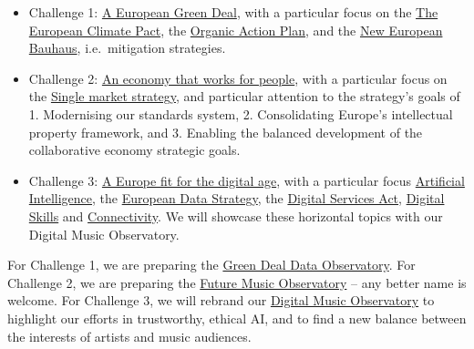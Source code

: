 \documentclass[
  a4paper,
  openany, a4paper, oneside]{book}
\providecommand{\tightlist}{%
  \setlength{\itemsep}{0pt}\setlength{\parskip}{0pt}}
\begin{document}
\begin{itemize}
\tightlist
\item
  Challenge 1: \href{https://ec.europa.eu/info/strategy/priorities-2019-2024/european-green-deal_en}{A European Green Deal}, with a particular focus on the \href{https://ec.europa.eu/commission/presscorner/detail/en/ip_20_2323}{The European Climate Pact}, the \href{https://ec.europa.eu/info/food-farming-fisheries/farming/organic-farming/organic-action-plan_en}{Organic Action Plan}, and the \href{https://ec.europa.eu/commission/presscorner/detail/en/IP_21_111}{New European Bauhaus}, i.e.~mitigation strategies.
\item
  Challenge 2: \href{https://ec.europa.eu/info/strategy/priorities-2019-2024/economy-works-people_en\#:~:text=Individuals\%20and\%20businesses\%20in\%20the,needs\%20of\%20the\%20EU's\%20citizens.}{An economy that works for people}, with a particular focus on the \href{https://ec.europa.eu/info/strategy/priorities-2019-2024/economy-works-people/internal-market_en}{Single market strategy}, and particular attention to the strategy's goals of 1. Modernising our standards system, 2. Consolidating Europe's intellectual property framework, and 3. Enabling the balanced development of the collaborative economy strategic goals.
\item
  Challenge 3: \href{https://ec.europa.eu/info/strategy/priorities-2019-2024/europe-fit-digital-age_en}{A Europe fit for the digital age}, with a particular focus \href{https://ec.europa.eu/info/strategy/priorities-2019-2024/europe-fit-digital-age/excellence-trust-artificial-intelligence_en}{Artificial Intelligence}, the \href{https://ec.europa.eu/info/strategy/priorities-2019-2024/europe-fit-digital-age/european-data-strategy_en}{European Data Strategy},
  the \href{https://ec.europa.eu/info/strategy/priorities-2019-2024/europe-fit-digital-age/digital-services-act-ensuring-safe-and-accountable-online-environment_en}{Digital Services Act}, \href{https://digital-strategy.ec.europa.eu/en/policies/digital-skills-and-jobs}{Digital Skills} and \href{https://digital-strategy.ec.europa.eu/en/policies/connectivity}{Connectivity}. We will showcase these horizontal topics with our Digital Music Observatory.
\end{itemize}

For Challenge 1, we are preparing the \href{http://greendeal.dataobservatory.eu/}{Green Deal Data Observatory}.
For Challenge 2, we are preparing the \href{https://pensive-hawking-276760.netlify.app/}{Future Music Observatory} -- any better name is welcome.
For Challenge 3, we will rebrand our \href{https://music.dataobservatory.eu/}{Digital Music Observatory} to highlight our efforts in trustworthy, ethical AI, and to find a new balance between the interests of artists and music audiences.
\end{document}
